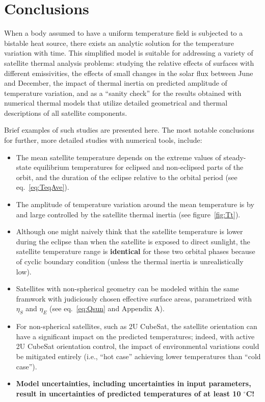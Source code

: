 \documentclass[]{aastex62}
\begin{document}
\section{Conclusions} 

When a body assumed to have a uniform temperature field is subjected to a bistable heat source,
there exists an analytic solution for the temperature variation with time. This simplified model is 
suitable for addressing a variety of satellite thermal analysis problems: studying the relative effects 
of surfaces with different emissivities, the effects of small changes in the solar flux between June 
and December, the impact of thermal inertia on predicted amplitude of temperature variation, and 
as a ``sanity check'' for the results obtained with numerical thermal models that utilize detailed 
geometrical and thermal descriptions of all satellite components. 

Brief examples of such studies are presented here. The most notable conclusions for further,
more detailed studies with numerical tools, include:
\begin{itemize}
\item The mean satellite temperature depends on the extreme values of steady-state equilibrium 
    temperatures for eclipsed and non-eclipsed parts of the orbit, and the duration of the eclipse
    relative to the orbital period (see eq.~\ref{eq:TeqAve}). 
\item The amplitude of temperature variation around the mean temperature is by and large 
     controlled by the satellite thermal inertia (see figure~\ref{fig:Tt}).
\item Although one might naively think that the satellite temperature is lower during the eclipse
    than when the satellite is exposed to direct sunlight, the satellite temperature range is {\bf identical} 
    for these two orbital phases because of cyclic boundary condition (unless the thermal inertia 
    is unrealistically low). 
\item Satellites with non-spherical geometry can be modeled within the same framwork with 
    judiciously chosen effective surface areas, parametrized with $\eta_S$ and $\eta_E$
    (see eq.~\ref{eq:Qsun} and Appendix A). 
\item For non-spherical satellites, such as 2U CubeSat, the satellite orientation can have a
    significant impact on the predicted temperatures; indeed, with active 2U CubeSat orientation 
    control, the impact of environmental variations could be mitigated entirely (i.e., ``hot case'' 
    achieving lower temperatures than ``cold case''). 
\item {\bf Model uncertainties, including uncertainties in input parameters, result in uncertainties
   of predicted temperatures of at least 10 $^\circ$C!} 
\end{itemize} 
\end{document}
